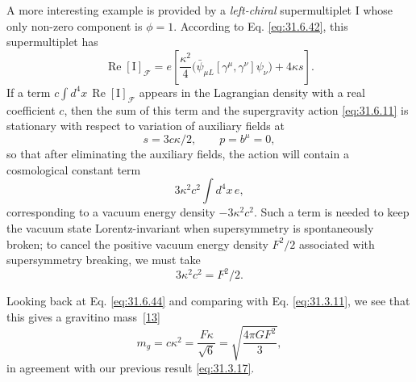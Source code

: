 A more interesting example is provided by a \emph{left-chiral}
supermultiplet \(\mathrm I\) whose only non-zero component is \(\phi=1\).
According to Eq. \eqref{eq:31.6.42}, this supermultiplet has
\begin{equation}
  \operatorname{Re}[\mathrm I]_{\mathcal F}
  =e\left[
    \frac{\kappa^2}{4}
      \bigl(\bar\psi_{\mu L}[\gamma^\mu,\gamma^\nu]\psi_\nu\bigr)
    +4\kappa s
  \right].
  \tag{31.6.44}\label{eq:31.6.44}
\end{equation}
If a term \(c\int d^4x\,\operatorname{Re}[\mathrm I]_{\mathcal F}\)
appears in the Lagrangian density with a real coefficient \(c\), then
the sum of this term and the supergravity action \eqref{eq:31.6.11} is
stationary with respect to variation of auxiliary fields at
\begin{equation}
  s=3c\kappa/2,\qquad p=b^\mu=0,
  \tag{31.6.45}\label{eq:31.6.45}
\end{equation}
so that after eliminating the auxiliary fields, the action will contain
a cosmological constant term
\begin{equation}
  3\kappa^2c^2\int d^4x\,e,
  \tag{31.6.46}\label{eq:31.6.46}
\end{equation}
corresponding to a vacuum energy density \(-3\kappa^2c^2\). Such a term
is needed to keep the vacuum state Lorentz-invariant when supersymmetry
is spontaneously broken; to cancel the positive vacuum energy density
\(F^2/2\) associated with supersymmetry breaking, we must take
\begin{equation}
  3\kappa^2c^2=F^2/2.
  \tag{31.6.47}\label{eq:31.6.47}
\end{equation}

Looking back at Eq. \eqref{eq:31.6.44} and comparing with
Eq. \eqref{eq:31.3.11}, we see that this gives a gravitino
mass~\hyperref[ch31-ref-13]{[13]}
\begin{equation}
  m_g=c\kappa^2
  =\frac{F\kappa}{\sqrt{6}}
  =\sqrt{\frac{4\pi G F^2}{3}},
  \tag{31.6.48}\label{eq:31.6.48}
\end{equation}
in agreement with our previous result \eqref{eq:31.3.17}.

